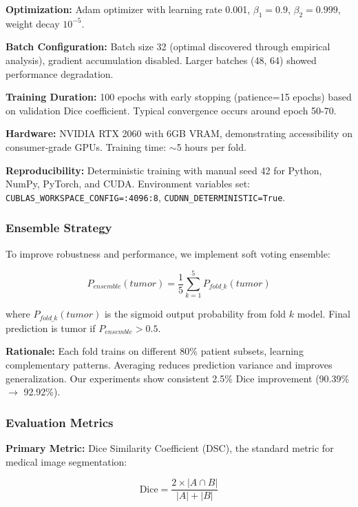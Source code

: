 \textbf{Optimization:} Adam optimizer with learning rate 0.001, $\beta_1=0.9$, $\beta_2=0.999$, weight decay $10^{-5}$.

\textbf{Batch Configuration:} Batch size 32 (optimal discovered through empirical analysis), gradient accumulation disabled. Larger batches (48, 64) showed performance degradation.

\textbf{Training Duration:} 100 epochs with early stopping (patience=15 epochs) based on validation Dice coefficient. Typical convergence occurs around epoch 50-70.

\textbf{Hardware:} NVIDIA RTX 2060 with 6GB VRAM, demonstrating accessibility on consumer-grade GPUs. Training time: $\sim$5 hours per fold.

\textbf{Reproducibility:} Deterministic training with manual seed 42 for Python, NumPy, PyTorch, and CUDA. Environment variables set: \texttt{CUBLAS\_WORKSPACE\_CONFIG=:4096:8}, \texttt{CUDNN\_DETERMINISTIC=True}.

\subsubsection{Ensemble Strategy}

To improve robustness and performance, we implement soft voting ensemble:

\begin{equation}
P_{ensemble}(tumor) = \frac{1}{5} \sum_{k=1}^{5} P_{fold\_k}(tumor)
\end{equation}

where $P_{fold\_k}(tumor)$ is the sigmoid output probability from fold $k$ model. Final prediction is tumor if $P_{ensemble} > 0.5$.

\textbf{Rationale:} Each fold trains on different 80\% patient subsets, learning complementary patterns. Averaging reduces prediction variance and improves generalization. Our experiments show consistent 2.5\% Dice improvement (90.39\% $\rightarrow$ 92.92\%).

\subsubsection{Evaluation Metrics}

\textbf{Primary Metric:} Dice Similarity Coefficient (DSC), the standard metric for medical image segmentation:

\begin{equation}
\text{Dice} = \frac{2 \times |A \cap B|}{|A| + |B|}
\end{equation}


